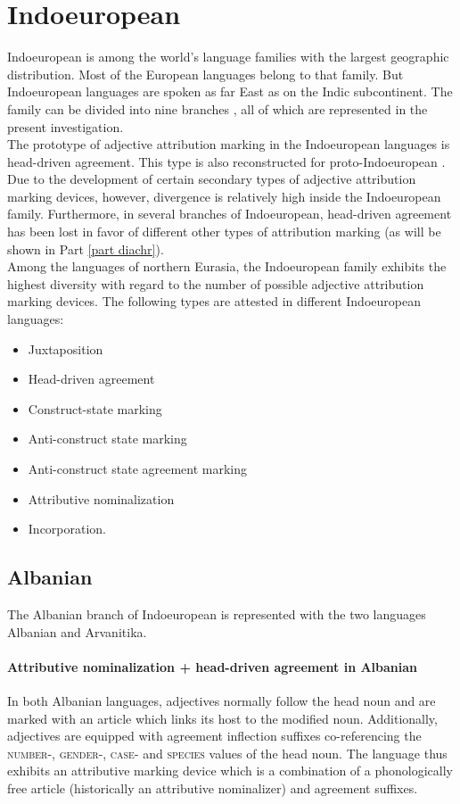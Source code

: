 \section{Indoeuropean}
Indoeuropean is among the world's language families with the largest geographic distribution. Most of the European languages belong to that family. But Indoeuropean languages are spoken as far East as on the Indic subcontinent. The family can be divided into nine branches \cite[218]{salminen2007}, all of which are represented in the present investigation.\\

\noindent The prototype of adjective attribution marking in the Indoeuropean languages is head-driven agreement. This type is also reconstructed for proto-Indoeuro\-pean \citep{decsy1991,watkins1998}. Due to the development of certain secondary types of adjective attribution marking devices, however, divergence is relatively high inside the Indoeuropean family. Furthermore, in several bran\-ches of Indoeuropean, head-driven agreement has been lost in favor of different other types of attribution marking (as will be shown in Part \ref{part diachr}).\\

\noindent Among the languages of northern Eurasia, the Indoeuropean family exhibits the highest diversity with regard to the number of possible adjective attribution marking devices. The following types are attested in different Indoeuropean languages:
\begin{itemize}
\item Juxtaposition
\item Head-driven agreement
\item Construct-state marking
\item Anti-construct state marking
\item Anti-construct state agreement marking
\item Attributive nominalization
\item Incorporation.
\end{itemize}

\subsection{Albanian} \label{albanian synchr}
The Albanian branch of Indoeuropean is represented with the two languages Albanian and Arvanitika.

\paragraph{Attributive nominalization + head-driven agreement in Albanian}
In both Albanian languages, adjectives normally follow the head noun and are marked with an article which links its host to the modified noun. Additionally, adjectives are equipped with agreement inflection suffixes co-referencing the \textsc{number}-, \textsc{gender}-, \textsc{case}- and \textsc{species} values of the head noun. The language thus exhibits an attributive marking device which is a combination of a phonologically free article (historically an attributive nominalizer) and agreement suffixes.

